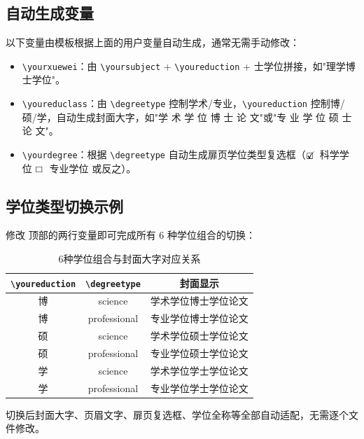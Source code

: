 \documentclass[../main-manual.tex]{subfiles}
\begin{document}
\subsection{自动生成变量}

以下变量由模板根据上面的用户变量自动生成，通常无需手动修改：

\begin{itemize}
	\item \verb|\yourxuewei|：由 \verb|\yoursubject| + \verb|\youreduction| + 士学位拼接，如"理学博士学位"。
	\item \verb|\youreduclass|：由 \verb|\degreetype| 控制学术/专业，\verb|\youreduction| 控制博/硕/学，自动生成封面大字，如"学 术 学 位 博 士 论 文"或"专 业 学 位 硕 士 论 文"。
	\item \verb|\yourdegree|：根据 \verb|\degreetype| 自动生成扉页学位类型复选框（$\boxcheck$ 科学学位 $\Boxempty$ 专业学位 或反之）。
\end{itemize}

\subsection{学位类型切换示例}

修改  顶部的两行变量即可完成所有 6 种学位组合的切换：

\begin{table}[htbp]
	\centering
	\caption{6种学位组合与封面大字对应关系}
	\label{tab:degree-combinations}
	\begin{tabular}{ccc}
		\toprule
		\verb|\youreduction| & \verb|\degreetype| & 封面显示 \\
		\midrule
		博 & science & 学术学位博士学位论文 \\
		博 & professional & 专业学位博士学位论文 \\
		硕 & science & 学术学位硕士学位论文 \\
		硕 & professional & 专业学位硕士学位论文 \\
		学 & science & 学术学位学士学位论文 \\
		学 & professional & 专业学位学士学位论文 \\
		\bottomrule
	\end{tabular}
\end{table}

切换后封面大字、页眉文字、扉页复选框、学位全称等全部自动适配，无需逐个文件修改。
\end{document}
